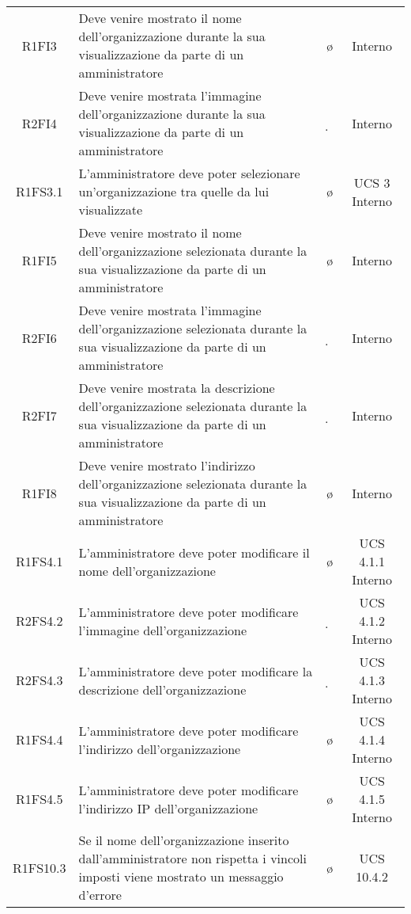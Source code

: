 {\begin{longtable}{ c C{8cm} c c}
R1FI3 & Deve venire mostrato il nome dell'organizzazione durante la sua visualizzazione da parte di un amministratore & \o & Interno\\

R2FI4 & Deve venire mostrata l'immagine dell'organizzazione durante la sua visualizzazione da parte di un amministratore & \d & Interno\\

R1FS3.1 & L'amministratore deve poter selezionare un'organizzazione tra quelle da lui visualizzate & \o & UCS 3 Interno\\

R1FI5 & Deve venire mostrato il nome dell'organizzazione selezionata durante la sua visualizzazione da parte di un amministratore & \o & Interno\\

R2FI6 & Deve venire mostrata l'immagine dell'organizzazione selezionata durante la sua visualizzazione da parte di un amministratore & \d & Interno\\

R2FI7 & Deve venire mostrata la descrizione dell'organizzazione selezionata durante la sua visualizzazione da parte di un amministratore & \d & Interno\\

R1FI8 & Deve venire mostrato l'indirizzo dell'organizzazione selezionata durante la sua visualizzazione da parte di un amministratore & \o & Interno\\


R1FS4.1 & L'amministratore deve poter modificare il nome dell'organizzazione & \o & UCS 4.1.1 Interno\\

R2FS4.2 & L'amministratore deve poter modificare l'immagine dell'organizzazione & \d & UCS 4.1.2 Interno\\

R2FS4.3 & L'amministratore deve poter modificare la descrizione dell'organizzazione & \d & UCS 4.1.3 Interno\\

R1FS4.4 & L'amministratore deve poter modificare l'indirizzo dell'organizzazione & \o & UCS 4.1.4 Interno\\

R1FS4.5 & L'amministratore deve poter modificare l'indirizzo IP dell'organizzazione & \o & UCS 4.1.5 Interno\\

R1FS10.3 & Se il nome dell'organizzazione inserito dall'amministratore non rispetta i vincoli imposti viene mostrato un messaggio d'errore & \o & UCS 10.4.2\\


\end{longtable}}
